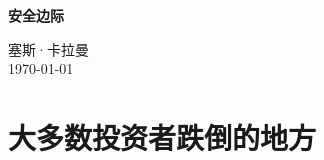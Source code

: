 \documentclass[12pt, a4paper, UTF8, fontset=adobe, oneside]{ctexbook} %
\begin{document}
\frontmatter
\begin{titlepage}
\begin{center}

\vspace*{5cm}
{\huge \bfseries 安全边际}\\[0.4cm]

\vspace{12cm}

{\large 塞斯·卡拉曼} \\[1cm]
{\large \today}

\end{center}
\end{titlepage}

{
\hypersetup{linkcolor=black} %
\tableofcontents %
}

\mainmatter%


\part{大多数投资者跌倒的地方}



\end{document}

